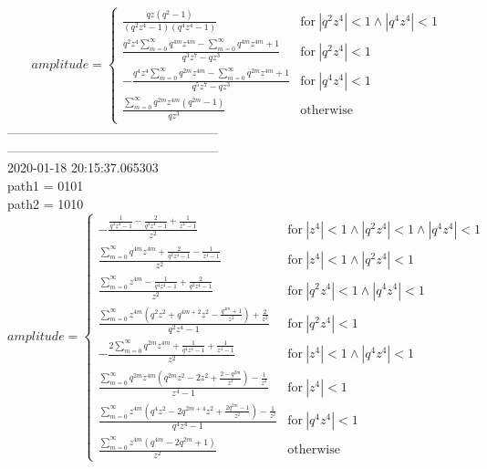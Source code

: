 \documentclass{jsreport}
\begin{document}
$$amplitude = \begin{cases} \frac{q z \left(q^{2} - 1\right)}{\left(q^{2} z^{4} - 1\right) \left(q^{4} z^{4} - 1\right)} & \text{for}\: \left|{q^{2} z^{4}}\right| < 1 \wedge \left|{q^{4} z^{4}}\right| < 1 \\\frac{q^{2} z^{4} \sum_{m=0}^{\infty} q^{4 m} z^{4 m} - \sum_{m=0}^{\infty} q^{4 m} z^{4 m} + 1}{q^{3} z^{7} - q z^{3}} & \text{for}\: \left|{q^{2} z^{4}}\right| < 1 \\- \frac{q^{4} z^{4} \sum_{m=0}^{\infty} q^{2 m} z^{4 m} - \sum_{m=0}^{\infty} q^{2 m} z^{4 m} + 1}{q^{5} z^{7} - q z^{3}} & \text{for}\: \left|{q^{4} z^{4}}\right| < 1 \\\frac{\sum_{m=0}^{\infty} q^{2 m} z^{4 m} \left(q^{2 m} - 1\right)}{q z^{3}} & \text{otherwise} \end{cases}$$
--------------------------------------------------\\
--------------------------------------------------\\
2020-01-18 20:15:37.065303\\
path1 = 0101\\
path2 = 1010\\
$$amplitude = \begin{cases} - \frac{\frac{1}{q^{4} z^{4} - 1} - \frac{2}{q^{2} z^{4} - 1} + \frac{1}{z^{4} - 1}}{z^{2}} & \text{for}\: \left|{z^{4}}\right| < 1 \wedge \left|{q^{2} z^{4}}\right| < 1 \wedge \left|{q^{4} z^{4}}\right| < 1 \\\frac{\sum_{m=0}^{\infty} q^{4 m} z^{4 m} + \frac{2}{q^{2} z^{4} - 1} - \frac{1}{z^{4} - 1}}{z^{2}} & \text{for}\: \left|{z^{4}}\right| < 1 \wedge \left|{q^{2} z^{4}}\right| < 1 \\\frac{\sum_{m=0}^{\infty} z^{4 m} - \frac{1}{q^{4} z^{4} - 1} + \frac{2}{q^{2} z^{4} - 1}}{z^{2}} & \text{for}\: \left|{q^{2} z^{4}}\right| < 1 \wedge \left|{q^{4} z^{4}}\right| < 1 \\\frac{\sum_{m=0}^{\infty} z^{4 m} \left(q^{2} z^{2} + q^{4 m + 2} z^{2} - \frac{q^{4 m} + 1}{z^{2}}\right) + \frac{2}{z^{2}}}{q^{2} z^{4} - 1} & \text{for}\: \left|{q^{2} z^{4}}\right| < 1 \\- \frac{2 \sum_{m=0}^{\infty} q^{2 m} z^{4 m} + \frac{1}{q^{4} z^{4} - 1} + \frac{1}{z^{4} - 1}}{z^{2}} & \text{for}\: \left|{z^{4}}\right| < 1 \wedge \left|{q^{4} z^{4}}\right| < 1 \\\frac{\sum_{m=0}^{\infty} q^{2 m} z^{4 m} \left(q^{2 m} z^{2} - 2 z^{2} + \frac{2 - q^{2 m}}{z^{2}}\right) - \frac{1}{z^{2}}}{z^{4} - 1} & \text{for}\: \left|{z^{4}}\right| < 1 \\\frac{\sum_{m=0}^{\infty} z^{4 m} \left(q^{4} z^{2} - 2 q^{2 m + 4} z^{2} + \frac{2 q^{2 m} - 1}{z^{2}}\right) - \frac{1}{z^{2}}}{q^{4} z^{4} - 1} & \text{for}\: \left|{q^{4} z^{4}}\right| < 1 \\\frac{\sum_{m=0}^{\infty} z^{4 m} \left(q^{4 m} - 2 q^{2 m} + 1\right)}{z^{2}} & \text{otherwise} \end{cases}$$
\end{document}
